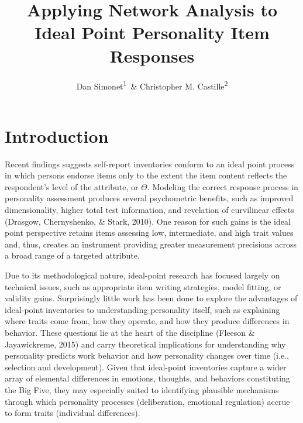 \documentclass[english,man]{apa6}
\title{Applying Network Analysis to Ideal Point Personality Item Responses}
\author{Dan Simonet\textsuperscript{1}~\& Christopher M. Castille\textsuperscript{2}}
\affiliation{
    \vspace{0.5cm}
          \textsuperscript{1} Montclair State University\\
          \textsuperscript{2} Nicholls State University  }
\theoremstyle{definition}
\theoremstyle{definition}
\theoremstyle{remark}
\begin{document}
\maketitle

\setcounter{secnumdepth}{0}



\section{\texorpdfstring{\textbf{Introduction}}{Introduction}}\label{introduction}

Recent findings suggests self-report inventories conform to an ideal
point process in which persons endorse items only to the extent the item
content reflects the respondent's level of the attribute, or \(\Theta\).
Modeling the correct response process in personality assessment produces
several psychometric benefits, such as improved dimensionality, higher
total test information, and revelation of curvilinear effects (Drasgow,
Chernyshenko, \& Stark, 2010). One reason for such gains is the ideal
point perspective retains items assessing low, intermediate, and high
trait values and, thus, creates an instrument providing greater
measurement precisions across a broad range of a targeted attribute.

Due to its methodological nature, ideal-point research has focused
largely on technical issues, such as appropriate item writing
strategies, model fitting, or validity gains. Surprisingly little work
has been done to explore the advantages of ideal-point inventories to
understanding personality itself, such as explaining where traits come
from, how they operate, and how they produce differences in behavior.
These questions lie at the heart of the discipline (Fleeson \&
Jayawickreme, 2015) and carry theoretical implications for understanding
why personality predicts work behavior and how personality changes over
time (i.e., selection and development). Given that ideal-point
inventories capture a wider array of elemental differences in emotions,
thoughts, and behaviors constituting the Big Five, they may especially
suited to identifying plausible mechanisms through which personality
processes (deliberation, emotional regulation) accrue to form traits
(individual differences).
\end{document}
